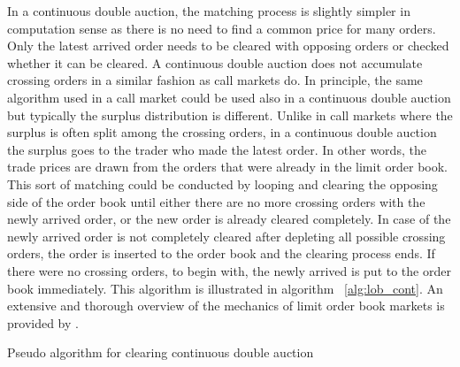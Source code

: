 In a continuous double auction, the matching process is slightly simpler in computation
sense as there is no need to find a common price for many orders. Only the latest arrived
order needs to be cleared with opposing orders or checked whether it can be cleared. A continuous
double auction does not accumulate crossing orders in a similar fashion as call markets do. 
In principle, the same algorithm used in a call market could be used also in a continuous double auction 
but typically the surplus distribution is different. Unlike in call markets where the surplus is often
split among the crossing orders, in a continuous double auction the surplus goes to the trader who made the 
latest order. In other words, the trade prices are drawn from the orders that were already in the limit 
order book. This sort of matching could be conducted by looping and clearing the opposing side of the 
order book until either there are no more crossing orders with the newly arrived order, or the new 
order is already cleared completely. In case of the newly arrived order is not completely cleared after 
depleting all possible crossing orders, the order is inserted to the order book and the clearing process 
ends. If there were no crossing orders, to begin with, the newly arrived is put to the order book immediately. 
This algorithm is illustrated in algorithm ~\ref{alg:lob_cont}. An extensive and thorough overview of the mechanics 
of limit order book markets is provided by \citet{lob13}.

\begin{algorithm}[H]
    \SetAlgoLined
    \DontPrintSemicolon

    \caption{Pseudo algorithm for clearing continuous double auction}
    \label{alg:lob_cont}
\end{algorithm}


